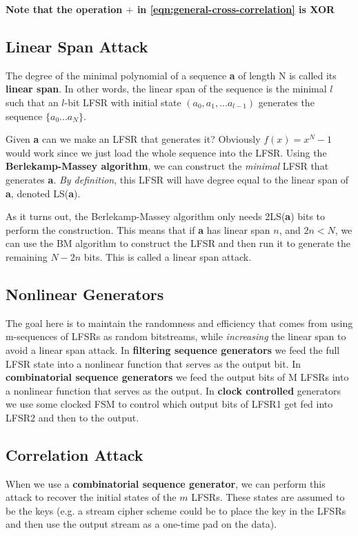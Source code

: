 \documentclass[11pt]{report}
\begin{document}
\textbf{Note that the operation $+$ in \autoref{eqn:general-cross-correlation} is XOR}


\subsection{Linear Span Attack}
The degree of the minimal polynomial of a sequence \textbf{a} of length N is called its \textbf{linear span}. In other words, the linear span of the sequence is the minimal $l$ such that an $l$-bit LFSR with initial state $(a_0, a_1, ...a_{l-1})$ generates the sequence $\{a_0 ... a_N\}$.

Given \textbf{a} can we make an LFSR that generates it? Obviously $f(x) = x^N-1$ would work since we just load the whole sequence into the LFSR. Using the \textbf{Berlekamp-Massey algorithm}, we can construct the \textit{minimal} LFSR that generates \textbf{a}. \textit{By definition}, this LFSR will have degree equal to the linear span of \textbf{a}, denoted LS(\textbf{a}).

As it turns out, the Berlekamp-Massey algorithm only needs 2LS(\textbf{a}) bits to perform the construction. This means that if \textbf{a} has linear span $n$, and $2n < N$, we can use the BM algorithm to construct the LFSR and then run it to generate the remaining $N-2n$ bits. This is called a linear span attack.

\subsection{Nonlinear Generators}
The goal here is to maintain the randomness and efficiency that comes from using m-sequences of LFSRs as random bitstreams, while \textit{increasing} the linear span to avoid a linear span attack. In \textbf{filtering sequence generators} we feed the full LFSR state into a nonlinear function that serves as the output bit. In \textbf{combinatorial sequence generators} we feed the output bits of M LFSRs into a nonlinear function that serves as the output. In \textbf{clock controlled} generators we use some clocked FSM to control which output bits of LFSR1 get fed into LFSR2 and then to the output.

\subsection{Correlation Attack}
When we use a \textbf{combinatorial sequence generator}, we can perform this attack to recover the initial states of the $m$ LFSRs. These states are assumed to be the keys (e.g. a stream cipher scheme could be to place the key in the LFSRs and then use the output stream as a one-time pad on the data).
\end{document}
